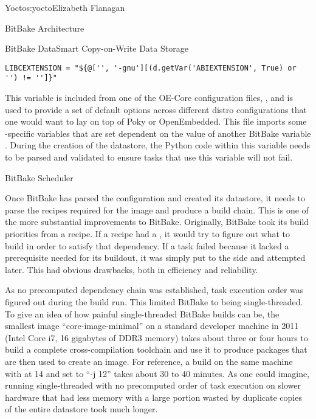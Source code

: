 \begin{aosachapter}{Yocto}{s:yocto}{Elizabeth Flanagan}
\begin{aosasect1}{BitBake Architecture}
\begin{aosasect2}{BitBake DataSmart Copy-on-Write Data Storage}
\begin{verbatim}
LIBCEXTENSION = "${@['', '-gnu'][(d.getVar('ABIEXTENSION', True) or '') != '']}"
\end{verbatim}

This variable is included from one of the OE-Core configuration files,
\linebreak {}, and is used to
provide a set of default options across different distro
configurations that one would want to lay on top of Poky or
OpenEmbedded. This file imports some -specific variables that
are set dependent on the value of another BitBake variable
. During the creation of the datastore, the Python code within
this variable needs to be parsed and validated to ensure tasks that
use this variable will not fail.

\end{aosasect2}

\begin{aosasect2}{BitBake Scheduler}

Once BitBake has parsed the configuration and created its datastore,
it needs to parse the recipes required for the image and produce a
build chain. This is one of the more substantial improvements to
BitBake. Originally, BitBake took its build priorities from a
recipe. If a recipe had a , it would try to figure out what to
build in order to satisfy that dependency. If a task failed because it
lacked a prerequisite needed for its buildout, it was simply put to
the side and attempted later. This had obvious drawbacks, both in
efficiency and reliability.

As no precomputed dependency chain was established, task execution
order was figured out during the build run. This limited BitBake to
being single-threaded. To give an idea of how painful
single-threaded BitBake builds can be, the smallest image
``core-image-minimal'' on a standard developer machine in 2011
(Intel Core i7, 16 gigabytes of DDR3
memory) takes about three or four hours to build a complete cross-compilation 
toolchain and use it to produce packages that are then
used to create an image. For reference, a build on the same machine
with  at 14 and  set to ``-j 12''
takes about 30 to 40 minutes. As one could imagine, running single-threaded
with no precomputed order of task execution on slower
hardware that had less memory with a large portion wasted by duplicate
copies of the entire datastore took much longer.


\end{aosasect2}
\end{aosasect1}
\end{aosachapter}
